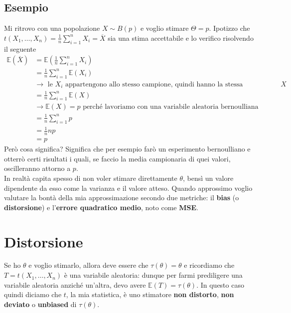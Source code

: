 \documentclass[11pt]{report}
\begin{document}
\subsection{Esempio}
Mi ritrovo con una popolazione $X \sim B(p)$ e voglio stimare $\Theta = p$. Ipotizzo che $t(X_1, \dots, X_n) = \frac{1}{n} \sum_{i=1}^n X_i = \overline{X}$ sia una stima accettabile e lo verifico risolvendo il seguente
\begin{equation}
    \begin{split}
        \mathbb{E}(\overline{X}) & = \mathbb{E} \left( \frac{1}{n} \sum_{i=1}^n X_i \right)\\
        & = \frac{1}{n} \sum_{i=1}^n \mathbb{E}(X_i)\\
        & \rightarrow \text{ le } X_i \text{ appartengono allo stesso campione, quindi hanno la stessa distribuzione di } X\\
        & = \frac{1}{n} \sum_{i=1}^n \mathbb{E}(X)\\
        & \rightarrow \mathbb{E}(X) = p \text{ perché lavoriamo con una variabile aleatoria bernoulliana}\\
        & = \frac{1}{n} \sum_{i=1}^n p\\
        & = \frac{1}{n} np\\
        & = p
    \end{split}
\end{equation}
Però cosa significa? Significa che per esempio farò un esperimento bernoulliano e otterrò certi risultati i quali, se faccio la media campionaria di quei valori, oscilleranno attorno a $p$.\\
In realtà capita spesso di non voler stimare direttamente $\theta$, bensì un valore dipendente da esso come la varianza e il valore atteso. Quando approssimo voglio valutare la bontà della mia approssimazione secondo due metriche: il \textbf{bias} (o \textbf{distorsione}) e l'\textbf{errore quadratico medio}, noto come \textbf{MSE}.

\section{Distorsione}
Se ho $\theta$ e voglio stimarlo, allora deve essere che $\tau(\theta) = \theta$ e ricordiamo che $T = t(X_1, \dots, X_n)$ è una variabile aleatoria: dunque per farmi prediligere una variabile aleatoria anziché un'altra, devo avere $\mathbb{E}(T) = \tau(\theta)$. In questo caso quindi diciamo che $t$, la mia statistica, è uno stimatore \textbf{non distorto}, \textbf{non deviato} o \textbf{unbiased} di $\tau(\theta)$.
\end{document}
